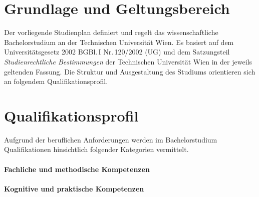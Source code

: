 
\newcommand*\Markierung{Bachelor}
\newcommand*\Studienart{Bachelorstudium}
\newcommand*\ArtikelAkkusativStudienart{das}


\DECKBLATT

\tableofcontents
\clearpage

\section{Grundlage und Geltungsbereich}\label{sec:GG}

Der vorliegende Studienplan definiert und regelt das
{}wissenschaftliche Bachelorstudium \emph{} an
der Technischen Universität Wien. Es basiert auf dem
Universitätsgesetz 2002 BGBl.\,I Nr.\,120/2002 (UG) und dem
Satzungsteil \emph{Studienrechtliche Bestimmungen} der Technischen
Universität Wien in der jeweils geltenden Fassung. Die Struktur und
Ausgestaltung des Studiums orientieren sich an folgendem
Qualifikationsprofil.

\section{Qualifikationsprofil}\label{sec:QP}

\newcommand*\QPIntro{%
  Das Bachelorstudium \emph{\VAR{Titel}} vermittelt eine breite,
  wissenschaftlich und methodisch hochwertige, auf dauerhaftes Wissen
  ausgerichtete Grund\-ausbildung, welche die Absolvent\_innen 
  sowohl für eine Weiterqualifizierung im Rahmen eines
  facheinschlägigen Masterstudiums als auch für eine Beschäftigung in
  beispielsweise folgenden Tätigkeitsbereichen befähigt und
  international konkurrenzfähig macht:%
}%

%

%

Aufgrund der beruflichen Anforderungen werden im Bachelorstudium
\emph{} Qualifikationen hinsichtlich folgender Kategorien
vermittelt.

\paragraph{Fachliche und methodische Kompetenzen}
%

\paragraph{Kognitive und praktische Kompetenzen}
%


